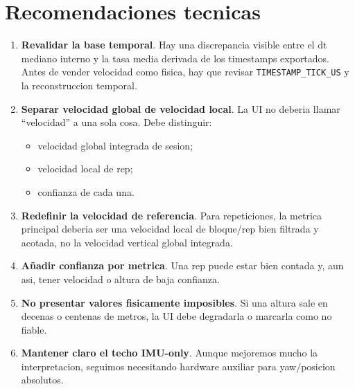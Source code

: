 \documentclass[11pt,a4paper]{article}
\begin{document}
\section{Recomendaciones tecnicas}
\begin{enumerate}[leftmargin=16pt]
  \item \textbf{Revalidar la base temporal}. Hay una discrepancia visible entre el dt mediano interno y la tasa media derivada de los timestamps exportados. Antes de vender velocidad como fisica, hay que revisar \texttt{TIMESTAMP\_TICK\_US} y la reconstruccion temporal.
  \item \textbf{Separar velocidad global de velocidad local}. La UI no deberia llamar ``velocidad'' a una sola cosa. Debe distinguir:
  \begin{itemize}[leftmargin=14pt]
    \item velocidad global integrada de sesion;
    \item velocidad local de rep;
    \item confianza de cada una.
  \end{itemize}
  \item \textbf{Redefinir la velocidad de referencia}. Para repeticiones, la metrica principal deberia ser una velocidad local de bloque/rep bien filtrada y acotada, no la velocidad vertical global integrada.
  \item \textbf{Añadir confianza por metrica}. Una rep puede estar bien contada y, aun asi, tener velocidad o altura de baja confianza.
  \item \textbf{No presentar valores fisicamente imposibles}. Si una altura sale en decenas o centenas de metros, la UI debe degradarla o marcarla como no fiable.
  \item \textbf{Mantener claro el techo IMU-only}. Aunque mejoremos mucho la interpretacion, seguimos necesitando hardware auxiliar para yaw/posicion absolutos.
\end{enumerate}
\end{document}
